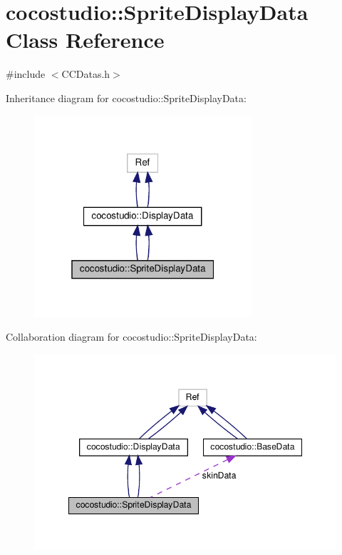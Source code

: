\hypertarget{classcocostudio_1_1SpriteDisplayData}{}\section{cocostudio\+:\+:Sprite\+Display\+Data Class Reference}
\label{classcocostudio_1_1SpriteDisplayData}


{\ttfamily \#include $<$C\+C\+Datas.\+h$>$}



Inheritance diagram for cocostudio\+:\+:Sprite\+Display\+Data\+:
\nopagebreak
\begin{figure}[H]
\begin{center}
\leavevmode
\includegraphics[width=229pt]{classcocostudio_1_1SpriteDisplayData__inherit__graph}
\end{center}
\end{figure}


Collaboration diagram for cocostudio\+:\+:Sprite\+Display\+Data\+:
\nopagebreak
\begin{figure}[H]
\begin{center}
\leavevmode
\includegraphics[width=348pt]{classcocostudio_1_1SpriteDisplayData__coll__graph}
\end{center}
\end{figure}
